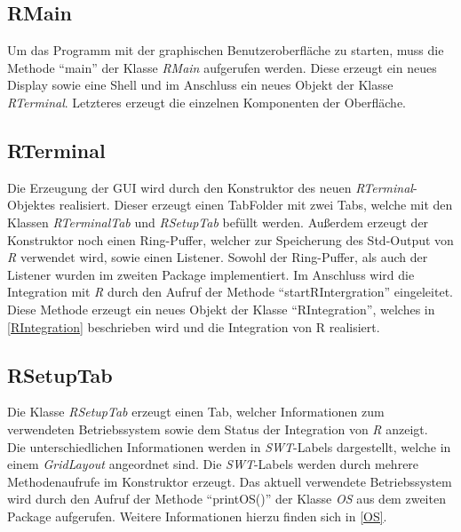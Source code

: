 \documentclass[a4paper, 12pt]{report} %
\begin{document}
\subsection{RMain}

Um das Programm mit der graphischen Benutzeroberfläche zu starten, muss die Methode "`main"' der Klasse \textit{RMain} aufgerufen werden. Diese erzeugt ein neues Display sowie eine Shell und im Anschluss ein neues Objekt der Klasse \textit{RTerminal}.
Letzteres erzeugt die einzelnen Komponenten der Oberfläche.

\subsection{RTerminal}

Die Erzeugung der GUI wird durch den Konstruktor des neuen \textit{RTerminal}-Objektes realisiert. Dieser erzeugt einen TabFolder mit zwei Tabs, welche mit den Klassen \textit{RTerminalTab} und \textit{RSetupTab} befüllt werden.
Außerdem erzeugt der Konstruktor noch einen Ring-Puffer, welcher zur Speicherung des Std-Output von \textit{R} verwendet wird, sowie einen Listener. Sowohl der Ring-Puffer, als auch der Listener wurden im zweiten Package implementiert.
Im Anschluss wird die Integration mit \textit{R} durch den Aufruf der Methode "`startRIntergration"' eingeleitet.\\

Diese Methode erzeugt ein neues Objekt der Klasse "`RIntegration"', welches in \ref{RIntegration} beschrieben wird und die Integration von R realisiert.

\subsection{RSetupTab}

Die Klasse \textit{RSetupTab} erzeugt einen Tab, welcher Informationen zum verwendeten Betriebssystem sowie dem Status der Integration von \textit{R} anzeigt.\\

Die unterschiedlichen Informationen werden in \textit{SWT}-Labels dargestellt, welche in einem \textit{GridLayout} angeordnet sind.
Die \textit{SWT}-Labels werden durch mehrere Methodenaufrufe im Konstruktor erzeugt.
Das aktuell verwendete Betriebssystem wird durch den Aufruf der Methode "`printOS()"' der Klasse \textit{OS} aus dem zweiten Package aufgerufen. Weitere Informationen hierzu finden sich in \ref{OS}.
\end{document}
